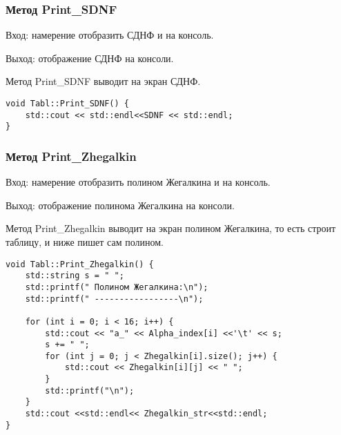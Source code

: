 \documentclass[10pt,a4paper,final]{article} %
\begin{document}
\subsubsection{Метод Print\_SDNF}
\par Вход: намерение отобразить  СДНФ и на консоль. 
\par Выход: отображение СДНФ на консоли.
\par Метод Print\_SDNF выводит на экран СДНФ.
\begin{lstlisting}[caption={Метод Print\_SDNF}]
void Tabl::Print_SDNF() {
	std::cout << std::endl<<SDNF << std::endl;
}
\end{lstlisting}

\subsubsection{Метод Print\_Zhegalkin}
\par Вход: намерение отобразить  полином Жегалкина и на консоль. 
\par Выход: отображение полинома Жегалкина на консоли.
\par Метод Print\_Zhegalkin выводит на экран полином Жегалкина, то есть строит таблицу, и ниже пишет сам полином.
\begin{lstlisting}[caption={Метод Print\_Zhegalkin}]
void Tabl::Print_Zhegalkin() {
	std::string s = " ";
	std::printf(" Полином Жегалкина:\n");
	std::printf(" -----------------\n");
	
	for (int i = 0; i < 16; i++) {
		std::cout << "a_" << Alpha_index[i] <<'\t' << s;
		s += " ";
		for (int j = 0; j < Zhegalkin[i].size(); j++) {
			std::cout << Zhegalkin[i][j] << " ";
		}
		std::printf("\n");
	}
	std::cout <<std::endl<< Zhegalkin_str<<std::endl;
}
\end{lstlisting}
\end{document}
